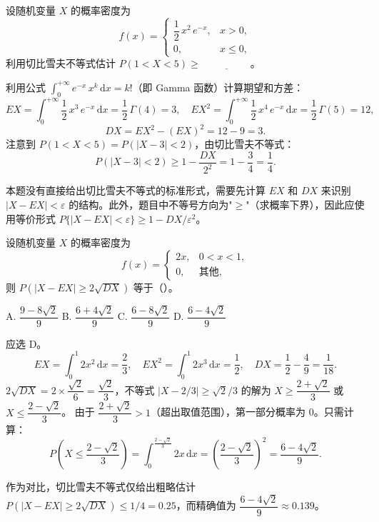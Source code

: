 ﻿\documentclass[lang=cn,11pt]{elegantbook}
\begin{document}
\begin{exercise}\label{exer:5-chebyshev-pdf}
设随机变量 \(X\) 的概率密度为
\[
f(x) = \begin{cases} \dfrac{1}{2}\,x^2\,e^{-x}, & x > 0, \\[4pt] 0, & x \leq 0, \end{cases}
\]
利用切比雪夫不等式估计 \(P(1 < X < 5) \geq\,\underline{\hspace{2cm}}\)。
\end{exercise}
\begin{solution}
利用公式 \(\displaystyle\int_0^{+\infty} e^{-x}\,x^k\,\mathrm{d}x = k!\)（即 Gamma 函数）计算期望和方差：
\[
EX = \int_0^{+\infty} \frac{1}{2}\,x^3\,e^{-x}\,\mathrm{d}x = \frac{1}{2}\,\Gamma(4) = 3,\quad
EX^2 = \int_0^{+\infty} \frac{1}{2}\,x^4\,e^{-x}\,\mathrm{d}x = \frac{1}{2}\,\Gamma(5) = 12,
\]
\[
DX = EX^2 - (EX)^2 = 12 - 9 = 3.
\]
注意到 \(P(1 < X < 5) = P(|X - 3| < 2)\)，由切比雪夫不等式：
\[
P(|X - 3| < 2) \geq 1 - \frac{DX}{2^2} = 1 - \frac{3}{4} = \frac{1}{4}.
\]

\begin{note}
本题没有直接给出切比雪夫不等式的标准形式，需要先计算 \(EX\) 和 \(DX\) 来识别 \(|X - EX| < \varepsilon\) 的结构。此外，题目中不等号方向为"\(\geq\)"（求概率下界），因此应使用等价形式 \(P\{|X-EX|<\varepsilon\} \geq 1 - DX/\varepsilon^2\)。
\end{note}
\end{solution}



\begin{exercise}\label{exer:5-chebyshev-exact}
设随机变量 \(X\) 的概率密度为
\[
f(x) = \begin{cases} 2x, & 0 < x < 1, \\ 0, & \text{其他}, \end{cases}
\]
则 \(P(|X - EX| \geq 2\sqrt{DX})\) 等于（\quad）。\par
A. \(\dfrac{9-8\sqrt{2}}{9}\)\quad
B. \(\dfrac{6+4\sqrt{2}}{9}\)\quad
C. \(\dfrac{6-8\sqrt{2}}{9}\)\quad
D. \(\dfrac{6-4\sqrt{2}}{9}\)
\end{exercise}
\begin{solution}
应选 D。
\[
EX = \int_0^1 2x^2\,\mathrm{d}x = \frac{2}{3},\quad
EX^2 = \int_0^1 2x^3\,\mathrm{d}x = \frac{1}{2},\quad
DX = \frac{1}{2} - \frac{4}{9} = \frac{1}{18}.
\]
\(2\sqrt{DX} = 2 \times \dfrac{\sqrt{2}}{6} = \dfrac{\sqrt{2}}{3}\)，不等式 \(|X - 2/3| \geq \sqrt{2}/3\) 的解为
\(X \geq \dfrac{2+\sqrt{2}}{3}\) 或 \(X \leq \dfrac{2-\sqrt{2}}{3}\)。
由于 \(\dfrac{2+\sqrt{2}}{3} > 1\)（超出取值范围），第一部分概率为 0。只需计算：
\[
P\!\left(X \leq \frac{2-\sqrt{2}}{3}\right) = \int_0^{\frac{2-\sqrt{2}}{3}} 2x\,\mathrm{d}x = \left(\frac{2-\sqrt{2}}{3}\right)^{\!2} = \frac{6-4\sqrt{2}}{9}.
\]
\begin{note}
作为对比，切比雪夫不等式仅给出粗略估计 \(P(|X-EX| \geq 2\sqrt{DX}) \leq 1/4 = 0.25\)，而精确值为 \(\dfrac{6-4\sqrt{2}}{9} \approx 0.139\)。
\end{note}
\end{solution}
\end{document}
